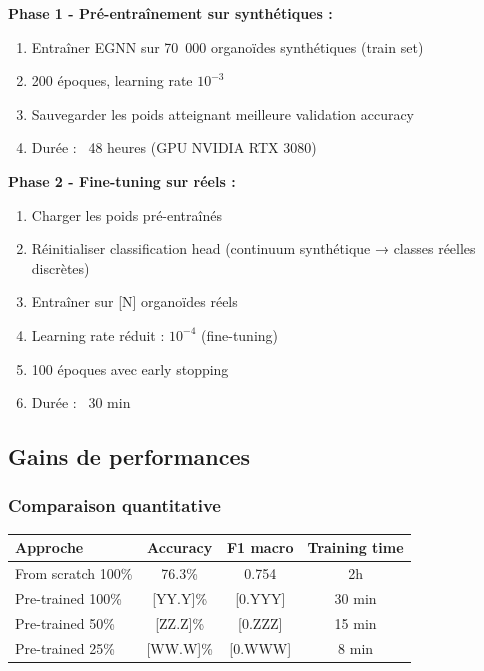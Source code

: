 \textbf{Phase 1 - Pré-entraînement sur synthétiques :}
\begin{enumerate}
    \item Entraîner EGNN sur 70~000 organoïdes synthétiques (train set)
    \item 200 époques, learning rate $10^{-3}$
    \item Sauvegarder les poids atteignant meilleure validation accuracy
    \item Durée : ~48 heures (GPU NVIDIA RTX 3080)
\end{enumerate}

\textbf{Phase 2 - Fine-tuning sur réels :}
\begin{enumerate}
    \item Charger les poids pré-entraînés
    \item Réinitialiser classification head (continuum synthétique → classes réelles discrètes)
    \item Entraîner sur [N] organoïdes réels
    \item Learning rate réduit : $10^{-4}$ (fine-tuning)
    \item 100 époques avec early stopping
    \item Durée : ~30 min
\end{enumerate}

\subsection{Gains de performances}

\subsubsection{Comparaison quantitative}

\begin{center}
\begin{tabular}{|l|c|c|c|}
\hline
\textbf{Approche} & \textbf{Accuracy} & \textbf{F1 macro} & \textbf{Training time} \\
\hline
From scratch 100\% & 76.3\% & 0.754 & 2h \\
Pre-trained 100\% & [YY.Y]\% & [0.YYY] & 30 min \\
Pre-trained 50\% & [ZZ.Z]\% & [0.ZZZ] & 15 min \\
Pre-trained 25\% & [WW.W]\% & [0.WWW] & 8 min \\
\hline
\end{tabular}
\end{center}

